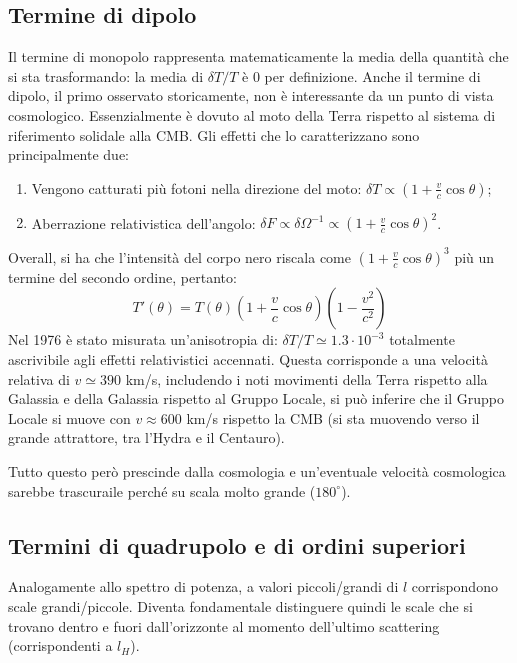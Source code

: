 \subsection{Termine di dipolo}
Il termine di monopolo rappresenta matematicamente la media della quantità che si sta trasformando: la media di $\delta T/T$ è $0$ per definizione. Anche il termine di dipolo, il primo osservato storicamente, non è interessante da un punto di vista cosmologico. Essenzialmente è dovuto al moto della Terra rispetto al sistema di riferimento solidale alla CMB. Gli effetti che lo caratterizzano sono principalmente due:
\begin{enumerate}
    \item Vengono catturati più fotoni nella direzione del moto: $\delta T \propto \left(1+\frac{v }{c}\cos\theta\right)$;
    \item Aberrazione relativistica dell'angolo: $\delta F \propto \delta\Omega^{-1} \propto  \left(1+\frac{v }{c}\cos\theta\right)^2$.
\end{enumerate}
Overall, si ha che l'intensità del corpo nero riscala come $\left(1+\frac{v }{c}\cos\theta\right)^3$ più un termine del secondo ordine, pertanto:
\begin{equation}
    T'(\theta)= T(\theta) \left(1+\frac{v}{c}\cos\theta \right)\left(1-\frac{v^2}{c^2}\right)
\end{equation}
Nel 1976 è stato misurata un'anisotropia di: $\delta T / T \simeq 1.3\cdot 10^{-3}$ totalmente ascrivibile agli effetti relativistici accennati. Questa corrisponde a una velocità relativa di $v\simeq 390$ km/s, includendo i noti movimenti della Terra rispetto alla Galassia e della Galassia rispetto al Gruppo Locale, si può inferire che il Gruppo Locale si muove con $v\approx 600$ km/s rispetto la CMB (si sta muovendo verso il grande attrattore, tra l'Hydra e il Centauro).

Tutto questo però prescinde dalla cosmologia e un'eventuale velocità cosmologica sarebbe trascuraile perché su scala molto grande ($180^\circ $). 

\subsection{Termini di quadrupolo e di ordini superiori}
Analogamente allo spettro di potenza, a valori piccoli/grandi di $l$ corrispondono scale grandi/piccole. Diventa fondamentale distinguere quindi le scale che si trovano dentro e fuori dall'orizzonte al momento dell'ultimo scattering (corrispondenti a $l_H$).

